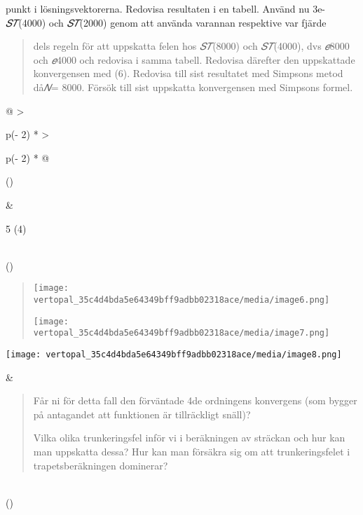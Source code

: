 \documentclass[
]{article}
\begin{document}
punkt i lösningsvektorerna. Redovisa resultaten i en tabell. Använd nu
3e-\emph{𝑆𝑇}(4000) och \emph{𝑆𝑇}(2000) genom att använda varannan
respektive var fjärde

\begin{quote}
dels regeln för att uppskatta felen hos \emph{𝑆𝑇}(8000) och
\emph{𝑆𝑇}(4000), dvs \emph{𝑒}8000 och \emph{𝑒}4000 och redovisa i samma
tabell. Redovisa därefter den uppskattade konvergensen med (6). Redovisa
till sist resultatet med Simpsons metod då\emph{𝑁}= 8000. Försök till
sist uppskatta konvergensen med Simpsons formel.
\end{quote}

\begin{longtable}[]{@{}
  >{\raggedright\arraybackslash}p{(\columnwidth - 2\tabcolsep) * }
  >{\raggedright\arraybackslash}p{(\columnwidth - 2\tabcolsep) * }@{}}
\toprule()
\begin{minipage}[b]{\linewidth}\raggedright
\end{minipage} & \begin{minipage}[b]{\linewidth}\raggedright
5 (4)
\end{minipage} \\
\midrule()
\endhead
\begin{minipage}[t]{\linewidth}\raggedright
\begin{quote}
\texttt{[image: vertopal\_35c4d4bda5e64349bff9adbb02318ace/media/image6.png]}

\texttt{[image: vertopal\_35c4d4bda5e64349bff9adbb02318ace/media/image7.png]}
\end{quote}

\texttt{[image: vertopal\_35c4d4bda5e64349bff9adbb02318ace/media/image8.png]}
\end{minipage} & \begin{minipage}[t]{\linewidth}\raggedright
\begin{quote}
Får ni för detta fall den förväntade 4de ordningens konvergens (som
bygger på antagandet att funktionen är tillräckligt snäll)?

Vilka olika trunkeringsfel inför vi i beräkningen av sträckan och hur
kan man uppskatta dessa? Hur kan man försäkra sig om att
trunkeringsfelet i trapetsberäkningen dominerar?
\end{quote}
\end{minipage} \\
\bottomrule()
\end{longtable}
\end{document}
